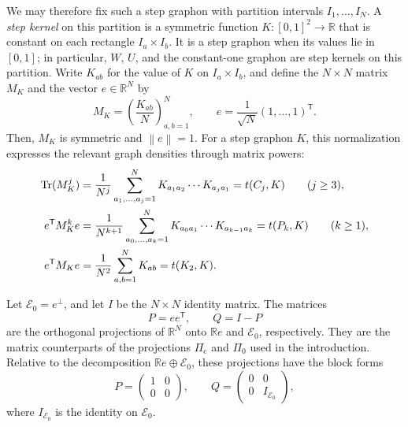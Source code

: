 \documentclass[11pt]{article}
\numberwithin{equation}{section}
\newcommand{\R}{\mathbb R}
\newcommand{\norm}[1]{\left\lVert #1\right\rVert}
\newcommand{\Tr}{\operatorname{Tr}}
\newcommand{\dens}[2]{t(#1,#2)}
\newcommand{\edens}[1]{t(K_{2},#1)}
\begin{document}
We may therefore fix such a step graphon with partition intervals
$I_1,\ldots,I_N$.
A \emph{step kernel} on this partition is a symmetric function $K\colon[0,1]^2\to\R$ that is constant on each rectangle $I_a\times I_b$.
It is a step graphon when its values lie in $[0,1]$; in particular, $W$, $U$, and the constant-one graphon are step kernels on this partition.
Write $K_{ab}$ for the value of $K$ on $I_a\times I_b$, and define the $N\times N$ matrix
$M_K$ and the vector $e\in\R^N$ by
\begin{equation*}
  M_K=\left(\frac{K_{ab}}N\right)_{a,b=1}^N,
  \qquad
  e=\frac1{\sqrt N}(1,\ldots,1)^{\mathsf T}.
\end{equation*}
Then, $M_K$ is symmetric and $\norm e=1$. For a step graphon $K$, this normalization expresses the relevant graph densities through matrix powers:
\begin{align}
  \Tr(M_K^j)
  &=\frac1{N^j}\sum_{a_1,\ldots,a_j=1}^N
    K_{a_1a_2}\cdots K_{a_ja_1}
   =\dens{C_j}K \qquad (j\ge3),\notag\\
  e^{\mathsf T}M_K^ke
  &=\frac1{N^{k+1}}\sum_{a_0,\ldots,a_k=1}^N
    K_{a_0a_1}\cdots K_{a_{k-1}a_k}
   =\dens{P_k}K \qquad (k\ge1),\notag\\
  e^{\mathsf T}M_Ke
  &=\frac1{N^2}\sum_{a,b=1}^NK_{ab}
   =\edens K. \label{eq:edge-matrix}
\end{align}

Let $\mathcal E_0=e^\perp$, and let $I$ be the $N\times N$ identity
matrix. The matrices
\[
  P=ee^{\mathsf T},
  \qquad
  Q=I-P
\]
are the orthogonal projections of $\R^N$ onto $\R e$ and $\mathcal E_0$,
respectively. They are the matrix counterparts of the projections
$\Pi_{\mathrm c}$ and $\Pi_0$ used in the introduction.
Relative to the decomposition $\R e\oplus\mathcal E_0$, these projections have the block forms
\begin{equation}\label{eq:block-PQ}
  P=\begin{pmatrix}1&0\\0&0\end{pmatrix},
  \qquad
  Q=\begin{pmatrix}0&0\\0&I_{\mathcal E_0}\end{pmatrix},
\end{equation}
where $I_{\mathcal E_0}$ is the identity on $\mathcal E_0$.
\end{document}
